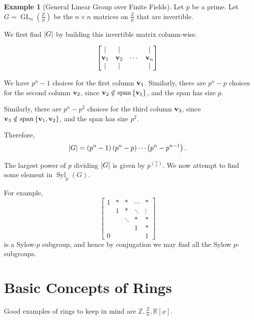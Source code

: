 \documentclass{article}
\theoremstyle{definition}
\newtheorem{example}[theorem]{Example}
\theoremstyle{remark}
\DeclarePairedDelimiter{\abs}{\lvert}{\rvert}
\newcommand{\pqty}[1]{\left(#1\right)}
\newcommand{\bqty}[1]{\left[#1\right]}
\newcommand{\Bqty}[1]{\left\{#1\right\}}
\newcommand{\flatfrac}[2]{\frac{#1}{#2}}
\newcommand{\bmqty}[1]{\begin{bmatrix}#1\end{bmatrix}}
\newcommand{\ZZ}{\mathbb{Z}}
\newcommand{\RR}{\mathbb{R}}
\newcommand{\GL}{\operatorname{GL}}
\newcommand{\Syl}{\operatorname{Syl}}
\newcommand{\spn}{\operatorname{span}}
\begin{document}
\begin{example}[General Linear Group over Finite Fields]
    \label{ex:gln-p}
    Let \(p\) be a prime. Let \(G = \GL_n \pqty{\flatfrac{\ZZ}{p}}\) be the \(n \times n\) matrices on \(\flatfrac{\ZZ}{p}\) that are invertible.

    We first find \(\abs{G}\) by building this invertible matrix column-wise.

    \[
        \bmqty{
            \vert & \vert & & \vert \\
            \vb{v}_1 & \vb{v}_2 & \cdots & \vb{v}_n \\
            \vert & \vert & & \vert
        }
    \]

    We have \(p^n - 1\) choices for the first column \(\vb{v}_1\). Similarly, there are \(p^n - p\) choices for the second column \(\vb{v}_2\), since \(\vb{v}_2 \notin \spn \Bqty{\vb{v}_1}\), and the span has size \(p\).

    Similarly, there are \(p^n - p^2\) choices for the third column \(\vb{v}_3\), since \(\vb{v}_3 \notin \spn \Bqty{\vb{v}_1, \vb{v}_2}\), and the span has size \(p^2\).

    Therefore,
    \[
        \abs{G} = \pqty{p^n - 1} \pqty{p^n - p} \cdots \pqty{p^n - p^{n - 1}}.
    \]  

    The largest power of \(p\) dividing \(\abs{G}\) is given by \(p^{\binom{n}{2}}\). We now attempt to find some element in \(\Syl_{p} \pqty{G}\).

    For example,
    \[
        \bmqty{
            1 & \ast & \ast   & \cdots & \ast \\
              & 1    & \ast   & \ddots & \vdots \\
              &      & \ddots & \ast   & \ast \\
              &      &        & 1      & \ast \\
            0 &      &        &        & 1 
        }
    \]
    is a Sylow-\(p\) subgroup, and hence by conjugation we may find all the Sylow \(p\)-subgroups.
\end{example}

\section{Basic Concepts of Rings}

Good examples of rings to keep in mind are \(\ZZ, \flatfrac{\ZZ}{n}, \RR \bqty{x}\).
\end{document}
